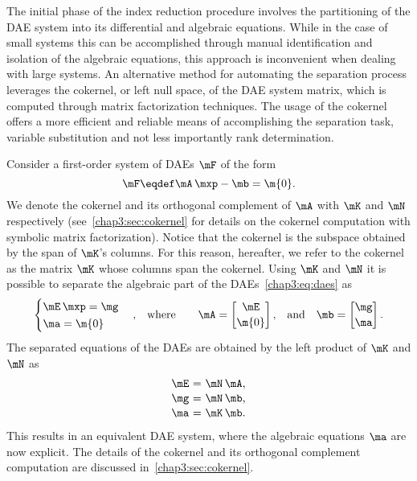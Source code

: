 The initial phase of the index reduction procedure involves the partitioning of the \ac{DAE} system into its differential and algebraic equations. While in the case of small systems this can be accomplished through manual identification and isolation of the algebraic equations, this approach is inconvenient when dealing with large systems. An alternative method for automating the separation process leverages the cokernel, or left null space, of the \ac{DAE} system matrix, which is computed through matrix factorization techniques. The usage of the cokernel offers a more efficient and reliable means of accomplishing the separation task, variable substitution and not less importantly rank determination.

Consider a first-order system of \acp{DAE} $\mF$ of the form
%
\begin{equation}
  \label{chap3:eq:daes}
  \mF \eqdef\mA \, \mxp - \mb = \m{0}.
\end{equation}
%
We denote the cokernel and its orthogonal complement of $\mA$ with $\mK$ and $\mN$ respectively (see~\ref{chap3:sec:cokernel} for details on the cokernel computation with symbolic matrix factorization). Notice that the cokernel is the subspace obtained by the span of $\mK$'s columns. For this reason, hereafter, we refer to the cokernel as the matrix $\mK$ whose columns span the cokernel. Using $\mK$ and $\mN$ it is possible to separate the algebraic part of the \acp{DAE}~\eqref{chap3:eq:daes} as
%
\begin{equation}
  \label{chap3:eq:separated_daes}
  \begin{cases}
    \mE \, \mxp = \mg \\[0.1em]
    \ma = \m{0}
  \end{cases} \text{,} \quad \text{where} \qquad \mA = \begin{bmatrix}
    \mE \\[0.2em]
    \m{0}
  \end{bmatrix} \text{,}
  \quad \text{and} \quad
  \mb = \begin{bmatrix}
     \mg \\[0.2em]
     \ma
  \end{bmatrix} \text{.}
\end{equation}
%
The separated equations of the \acp{DAE} are obtained by the left product of $\mK$ and $\mN$ as
%
\begin{equation}
  \begin{array}{l@{~}c@{~}l}
    \mE &=& \mN \, \mA \text{,} \\[0.1em]
    \mg &=& \mN \, \mb \text{,} \\[0.1em]
    \ma &=& \mK \, \mb \text{.}
  \end{array}
\end{equation}
%
This results in an equivalent \ac{DAE} system, where the algebraic equations $\ma$ are now explicit. The details of the cokernel and its orthogonal complement computation are discussed in~\ref{chap3:sec:cokernel}.


